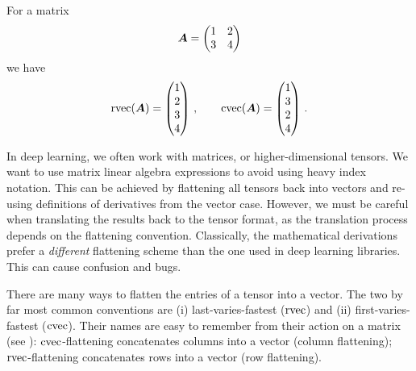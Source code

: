 \switchcolumn[1]
\begin{example}\label{ex:flattening}
  For a matrix
  \begin{equation*}
    {\bm{A}} = \begin{pmatrix} 1 & 2 \\ 3 & 4 \end{pmatrix}
  \end{equation*}
  we have
  \begin{equation*}
    \operatorname{rvec}({\bm{A}})
    =
    \begin{pmatrix}
      1 \\ 2 \\ 3 \\ 4
    \end{pmatrix}\,,
    \qquad
    \operatorname{cvec}({\bm{A}})
    =
    \begin{pmatrix}
      1 \\ 3 \\ 2 \\ 4
    \end{pmatrix}\,.
  \end{equation*}
\end{example}
\switchcolumn[0]

\vspace{\baselineskip}
\begin{caveat}[Flattening]
  In deep learning, we often work with matrices, or higher-dimensional tensors.
  We want to use matrix linear algebra expressions to avoid using heavy index notation.
  This can be achieved by flattening all tensors back into vectors and re-using definitions of derivatives from the vector case.
  However, we must be careful when translating the results back to the tensor format, as the translation process depends on the flattening convention.
  Classically, the mathematical derivations prefer a \emph{different} flattening scheme than the one used in deep learning libraries.
  This can cause confusion and bugs.
\end{caveat}

\switchcolumn[1]
\switchcolumn[0]

There are many ways to flatten the entries of a tensor into a vector.
The two by far most common conventions are (i) last-varies-fastest ($\operatorname{rvec}$) and (ii) first-varies-fastest ($\operatorname{cvec}$).
Their names are easy to remember from their action on a matrix (see ): $\operatorname{cvec}$-flattening concatenates columns into a vector (column flattening); $\operatorname{rvec}$-flattening concatenates rows into a vector (row flattening).

